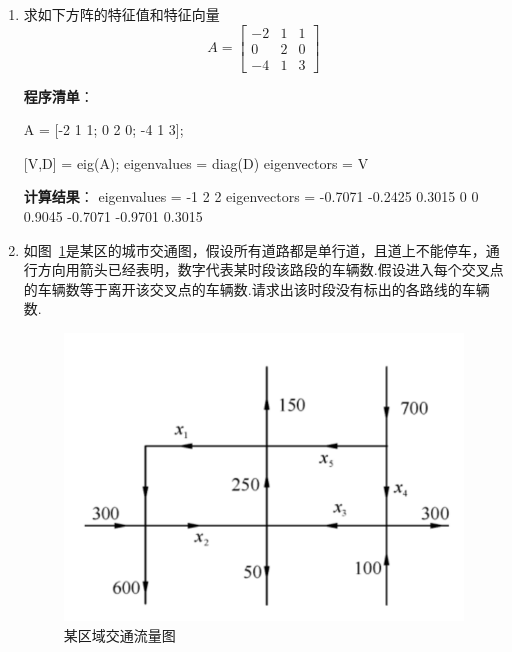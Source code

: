 \documentclass[zihao=-4]{ctexart}
\begin{document}
\begin{enumerate}
\textbf{程序清单}：
	\begin{mcode}
	syms x1 x2 x3 x4 x5
eq1 = 2*x1 + x2 + 3*x3 + 5*x4 - 5*x5 == 0;
eq2 = x1 + x2 + x3 + 4*x4 - 3*x5 == 0;
eq3 = 3*x1 + x2 + 5*x3 + 6*x4 - 7*x5 == 0;

[A,b] = equationsToMatrix([eq1,eq2,eq3],[x1,x2,x3,x4,x5]);
null_space = null(A)  %
	\end{mcode}
\textbf{计算结果}：
\begin{mcode}
null_space =
[-2, -1, 2]
[ 1, -3, 1]
[ 1,  0, 0]
[ 0,  1, 0]
[ 0,  0, 1]
\end{mcode}
\item 求如下方阵的特征值和特征向量
$$
A=\left[\begin{array}{ccc}
	-2 & 1 & 1 \\
	0 & 2 & 0 \\
	-4 & 1 & 3
\end{array}\right]
$$

\textbf{程序清单}：
\begin{mcode}
	A = [-2 1 1;
     0 2 0;
     -4 1 3];

[V,D] = eig(A);
eigenvalues = diag(D)
eigenvectors = V
\end{mcode}
\textbf{计算结果}：
eigenvalues =
	-1
     2
     2
eigenvectors =
   -0.7071   -0.2425    0.3015
         0         0    0.9045
   -0.7071   -0.9701    0.3015


\item 如图~\ref{fig:fig1}是某区的城市交通图，假设所有道路都是单行道，且道上不能停车，通行方向用箭头已经表明，数字代表某时段该路段的车辆数.假设进入每个交叉点的车辆数等于离开该交叉点的车辆数.请求出该时段没有标出的各路线的车辆数. 

\begin{figure}[H]
	\centering
	\includegraphics[width=0.7\linewidth]{fig1}
	\caption{某区域交通流量图}
	\label{fig:fig1}
\end{figure}



\end{enumerate}
\end{document}
